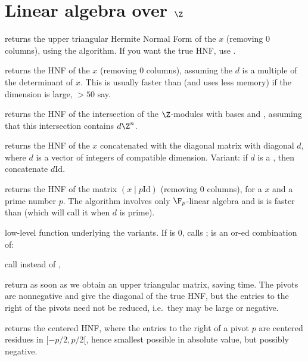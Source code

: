 \section{Linear algebra over $\Z$}

 returns the upper triangular Hermite Normal Form of the
 $x$ (removing $0$ columns), using the  algorithm. If you
want the true HNF, use .

 returns the HNF of the  $x$
(removing $0$ columns), assuming the  $d$ is a multiple of the
determinant of $x$. This is usually faster than  (and uses less
memory) if the dimension is large, $> 50$ say.

 returns the HNF of the
intersection of the $\Z$-modules with bases  and , assuming
that this intersection contains $d\*\Z^n$.

 returns the HNF of the 
$x$ concatenated with the diagonal matrix with diagonal $d$, where $d$ is a
vector of integers of compatible dimension. Variant: if $d$ is a ,
then concatenate $d \text{Id}$.

 returns the HNF of the matrix $(x \mid p
\text{Id})$ (removing $0$ columns), for a  $x$ and a prime number $p$.
The algorithm involves only $\F_p$-linear algebra and is is faster than
 (which will call it when $d$ is prime).

 low-level function
underlying the  variants. If  is $0$, calls
;  is an or-ed combination of:

\item {} call  instead of ,

\item {} return as soon as we obtain an upper triangular matrix,
saving time. The pivots are nonnegative and give the diagonal of the true HNF,
but the entries to the right of the pivots need not be reduced, i.e.~they may be
large or negative.

\item {} returns the centered HNF, where the entries to the
right of a pivot $p$ are centered residues in $[-p/2, p/2[$, hence smallest
possible in absolute value, but possibly negative.

